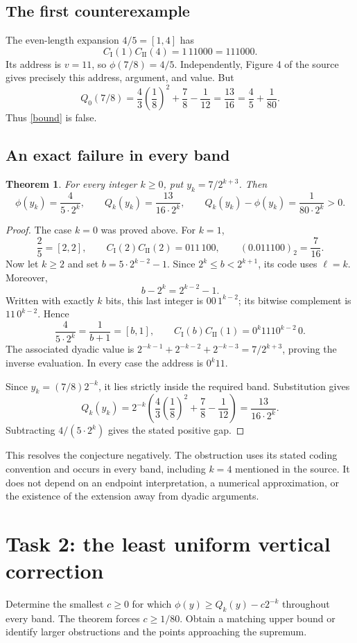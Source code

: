 \documentclass[11pt]{article}
\newtheorem{theorem}{Theorem}
\newcommand{\CI}{C_{\mathrm I}}
\newcommand{\CII}{C_{\mathrm {II}}}
\begin{document}
\subsection*{The first counterexample}
The even-length expansion $4/5=[1,4]$ has
\[
 \CI(1)\CII(4)=1\,11000=111000.
\]
Its address is $v=11$, so $\phi(7/8)=4/5$. Independently, Figure 4
of the source gives precisely this address, argument, and value.
But
\[
 Q_0(7/8)=\frac43\left(\frac18\right)^2+\frac78-\frac1{12}
         =\frac{13}{16}
         =\frac45+\frac1{80}.
\]
Thus \eqref{bound} is false.

\subsection*{An exact failure in every band}
\begin{theorem}
For every integer $k\geq0$, put $y_k=7/2^{k+3}$. Then
\[
 \phi(y_k)=\frac4{5\cdot2^k},\qquad
 Q_k(y_k)=\frac{13}{16\cdot2^k},\qquad
 Q_k(y_k)-\phi(y_k)=\frac1{80\cdot2^k}>0.
\]
\end{theorem}
\begin{proof}
The case $k=0$ was proved above. For $k=1$,
\[
 \frac25=[2,2],\qquad \CI(2)\CII(2)=011\,100,
 \qquad (0.011100)_2=\frac7{16}.
\]
Now let $k\geq2$ and set $b=5\cdot2^{k-2}-1$. Since
$2^k\leq b<2^{k+1}$, its code uses $\ell=k$. Moreover,
\[
 b-2^k=2^{k-2}-1.
\]
Written with exactly $k$ bits, this last integer is $00\,1^{k-2}$;
its bitwise complement is $11\,0^{k-2}$. Hence
\[
 \frac4{5\cdot2^k}=\frac1{b+1}=[b,1],\qquad
 \CI(b)\CII(1)=0^k1110^{k-2}\,0.
\]
The associated dyadic value is
$2^{-k-1}+2^{-k-2}+2^{-k-3}=7/2^{k+3}$, proving the inverse
evaluation. In every case the address is $0^k11$.

Since $y_k=(7/8)2^{-k}$, it lies strictly inside the required band.
Substitution gives
\[
 Q_k(y_k)=2^{-k}\left(\frac43\left(\frac18\right)^2
                  +\frac78-\frac1{12}\right)
         =\frac{13}{16\cdot2^k}.
\]
Subtracting $4/(5\cdot2^k)$ gives the stated positive gap.
\end{proof}

This resolves the conjecture negatively. The obstruction uses its
stated coding convention and occurs in every band, including
$k=4$ mentioned in the source. It does not depend on an endpoint
interpretation, a numerical approximation, or the existence of
the extension away from dyadic arguments.

\section*{Task 2: the least uniform vertical correction}
Determine the smallest $c\geq0$ for which
$\phi(y)\geq Q_k(y)-c2^{-k}$ throughout every band. The theorem
forces $c\geq1/80$. Obtain a matching upper bound or identify
larger obstructions and the points approaching the supremum.
\end{document}
